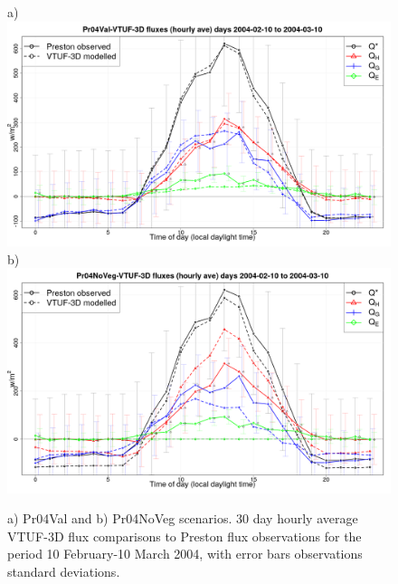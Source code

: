 \documentclass[final,3p,times,authoryear]{elsarticle}
\begin{document}
\begin{figure}[!htbp]
{\scriptsize a)} \includegraphics[trim = 0mm 0mm 0mm 0mm, clip, scale=0.16]{images/Pr04Val-EnergyBalanceOverallAve_.png}
{\scriptsize b)} \includegraphics[trim = 0mm 0mm 0mm 0mm, clip, scale=0.16]{images/Pr04NoVeg-EnergyBalanceOverallAve_.png}
\caption{a) Pr04Val and b) Pr04NoVeg scenarios. 30 day hourly average VTUF-3D flux comparisons to Preston flux observations for the period 10 February-10 March 2004, with error bars observations standard deviations. \label{fig:Prestonnoveg30day}}    
\end{figure}
\end{document}

